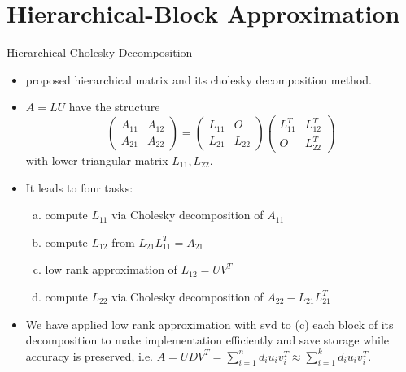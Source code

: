 \section{Hierarchical-Block Approximation}

\begin{frame}{Hierarchical Cholesky Decomposition}
\begin{itemize}
	\item \citet{hackbusch2015hierarchical} proposed hierarchical matrix and its cholesky decomposition method.
	\item $A=LU$ have the structure
	$$\begin{pmatrix}A_{11}&A_{12}\\A_{21}&A_{22}\end{pmatrix}=\begin{pmatrix}L_{11}&O\\L_{21}&L_{22}\end{pmatrix}\begin{pmatrix}L_{11}^T&L_{12}^T\\O&L_{22}^T\end{pmatrix}$$
	with lower triangular matrix $L_{11},L_{22}$.
	\item It leads to four tasks:
		\begin{enumerate}[(a)]
			\item compute $L_{11}$ via Cholesky decomposition of $A_{11}$
			\item compute $L_{12}$ from $L_{21}L_{11}^T = A_{21}$
			\item low rank approximation of $L_{12}=UV^T$
			\item compute $L_{22}$ via Cholesky decomposition of $A_{22}-L_{21}L_{21}^T$
		\end{enumerate}
	\item We have applied low rank approximation with svd to (c) each block of its decomposition to make implementation efficiently and save storage while accuracy is preserved, i.e. $A=UDV^T=\sum_{i=1}^n d_i u_iv_i^T\approx\sum_{i=1}^k d_i u_iv_i^T$.
	\end{itemize}
\end{frame}

